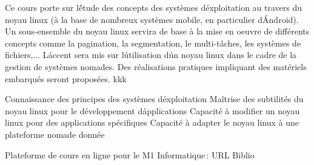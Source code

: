 



{
Ce cours porte sur l\'étude des concepts des systèmes d\'exploitation au travers du noyau linux (à la base de nombreux systèmes mobile, en particulier d\'Android).
Un sous-ensemble du noyau linux servira de base à la mise en oeuvre de différents concepts comme la pagination, la segmentation, le multi-tâches, les systèmes de fichiers,...
L\'accent sera mis sur l\'utilisation d\'un noyau linux dans le cadre de la gestion de systèmes nomades.
Des réalisations pratiques impliquant des matériels embarqués seront proposées.
} 
{kkk} 
{\begin{itemize}
\ObjItem Connaissance des principes des systèmes d\'exploitation
\ObjItem Maîtrise des subtilités du noyau linux pour le développement d\'applications
\ObjItem Capacité à modifier un noyau linux pour des applications spécifiques
\ObjItem Capacité à adapter le noyau linux à une plateforme nomade donnée
\end{itemize} 
} 
{Plateforme de cours en ligne pour le M1 Informatique\,: URL}
{Biblio}
 
\vfill

